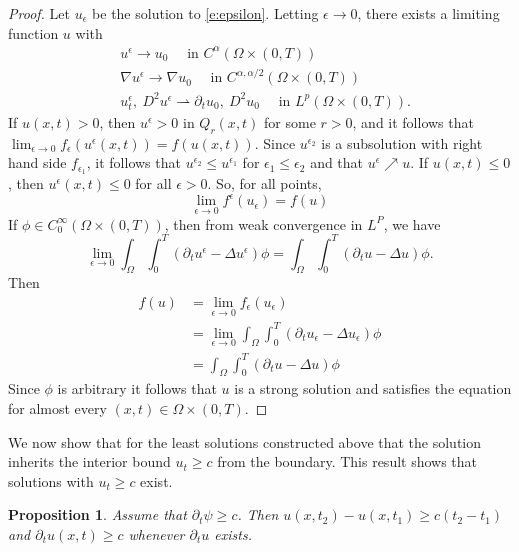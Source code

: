 \documentclass{amsart}
\newtheorem{proposition}[theorem]{Proposition}
\numberwithin{equation}{section}
\begin{document}
\begin{proof}
 Let $u_{\epsilon}$ be the solution to \eqref{e:epsilon}. Letting $\epsilon \to 0$, there exists a limiting function $u$ with 
 \[
 \begin{aligned}
  &u^{\epsilon} \to u_0 \quad \text{ in } C^{\alpha}( \Omega \times (0,T))\\
  &\nabla u^{\epsilon} \to \nabla u_0 \quad \text{ in } C^{\alpha,\alpha/2}( \Omega \times (0,T))\\
  &u_t^{\epsilon}, \ D^2 u^{\epsilon} \rightharpoonup \partial_t u_0, \ D^2 u_0 \quad \text{ in } L^p( \Omega \times (0,T)). 
 \end{aligned}
 \]
 If $u(x,t)>0$, then $u^{\epsilon}>0$ in $Q_r(x,t)$ for some $r>0$, and it follows that $\lim_{\epsilon \to 0} f_{\epsilon}(u^{\epsilon}(x,t))=f(u(x,t))$. 
 Since $u^{\epsilon_2}$ is a subsolution with right hand side $f_{\epsilon_1}$, it follows that   $u^{\epsilon_2} \leq u^{\epsilon_1}$ for $\epsilon_1 \leq \epsilon_2$ and that $u^{\epsilon} \nearrow u$. If $u(x,t)\leq 0$, then $u^{\epsilon}(x,t) \leq 0$ for all $\epsilon>0$. So, for all points, 
\[
\lim_{\epsilon \to 0} f^{\epsilon}(u_{\epsilon}) = f(u) 
\]
If $\phi \in C_0^{\infty}(\Omega \times (0,T))$, then from weak convergence in $L^P$, we have 
 \[
\lim_{\epsilon \to 0} \int_{\Omega}\int_0^T (\partial_t u^{\epsilon}- \Delta u^{\epsilon}) \phi = \int_{\Omega}\int_0^T (\partial_t u- \Delta u) \phi. 
 \]
 Then 
 \[
 \begin{aligned}
 f(u)&= \lim_{\epsilon \to 0} f_{\epsilon}(u_{\epsilon})\\
 &= \lim_{\epsilon \to 0} \int_{\Omega}\int_0^T (\partial_t u_{\epsilon}- \Delta u_{\epsilon}) \phi \\
 &= \int_{\Omega}\int_0^T (\partial_t u- \Delta u) \phi
 \end{aligned}
 \]
 Since $\phi$ is arbitrary it follows that $u$ is a strong solution and satisfies the equation for almost every $(x,t) \in \Omega \times (0,T)$. 
\end{proof}

We now show that for the least solutions constructed above that the solution inherits the interior bound $u_t \geq c$ from the boundary. This result shows that solutions with $u_t \geq c$ exist. 
\begin{proposition} \label{p:increase}
 Assume that $\partial_t \psi \geq c$. Then $u(x,t_2)-u(x,t_1)\geq c (t_2-t_1)$ and $\partial_t u(x,t)\geq c$ whenever $\partial_t u$ exists. 
\end{proposition}
\end{document}
